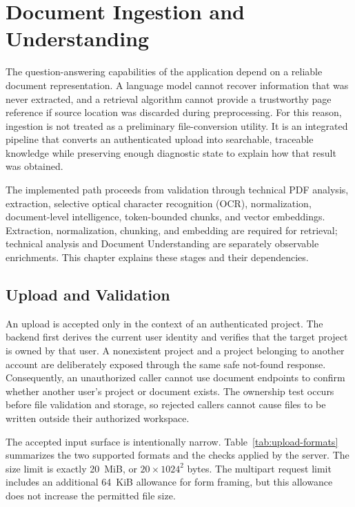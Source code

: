 \chapter[Document Ingestion and Understanding]{Document Ingestion and\\Understanding}
\label{chap:document-ingestion}

The question-answering capabilities of the application depend on a reliable
document representation. A language model cannot recover information that was
never extracted, and a retrieval algorithm cannot provide a trustworthy page
reference if source location was discarded during preprocessing. For this
reason, ingestion is not treated as a preliminary file-conversion utility. It
is an integrated pipeline that converts an authenticated upload into
searchable, traceable knowledge while preserving enough diagnostic state to
explain how that result was obtained.

The implemented path proceeds from validation through technical PDF analysis,
extraction, selective optical character recognition (OCR), normalization,
document-level intelligence, token-bounded chunks, and vector embeddings.
Extraction, normalization, chunking, and embedding are required for retrieval;
technical analysis and Document Understanding are separately observable
enrichments. This chapter explains these stages and their dependencies.

\section{Upload and Validation}
\label{sec:upload-validation}

An upload is accepted only in the context of an authenticated project. The
backend first derives the current user identity and verifies that the target
project is owned by that user. A nonexistent project and a project belonging
to another account are deliberately exposed through the same safe not-found
response. Consequently, an unauthorized caller cannot use document endpoints
to confirm whether another user's project or document exists. The ownership
test occurs before file validation and storage, so rejected callers cannot
cause files to be written outside their authorized workspace.

The accepted input surface is intentionally narrow. Table~\ref{tab:upload-formats}
summarizes the two supported formats and the checks applied by the server.
The size limit is exactly 20~MiB, or $20 \times 1024^2$ bytes. The multipart
request limit includes an additional 64~KiB allowance for form framing, but
this allowance does not increase the permitted file size.

